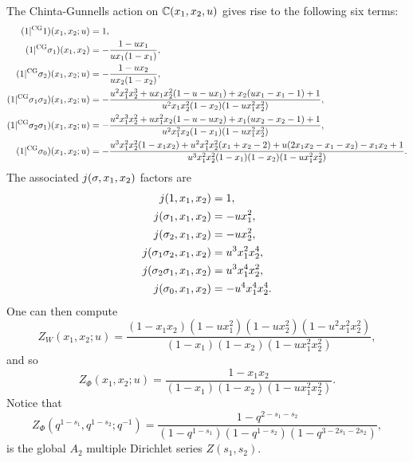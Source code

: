     The Chinta-Gunnells action on $\mathbb{C}(x_{1},x_{2},u)$ gives rise to the following six terms:
    \begin{align*}
        (1|^{\mathrm{CG}}1)(x_{1},x_{2};u) &= 1, \\
        (1|^{\mathrm{CG}}\sigma_{1})(x_{1},x_{2}) &= -\frac{1-ux_{1}}{ux_{1}(1-x_{1})}, \\
        (1|^{\mathrm{CG}}\sigma_{2})(x_{1},x_{2};u) &= -\frac{1-ux_{2}}{ux_{2}(1-x_{2})}, \\
        (1|^{\mathrm{CG}}\sigma_{1}\sigma_{2})(x_{1},x_{2};u) &= -\frac{u^{2}x_{1}^{2}x_{2}^{3}+ux_{1}x_{2}^{2}(1-u-ux_{1})+x_{2}(ux_{1}-x_{1}-1)+1}{u^{2}x_{1}x_{2}^{2}(1-x_{2})(1-ux_{1}^{2}x_{2}^{2})}, \\
        (1|^{\mathrm{CG}}\sigma_{2}\sigma_{1})(x_{1},x_{2};u) &= -\frac{u^{2}x_{1}^{3}x_{2}^{2}+ux_{1}^{2}x_{2}(1-u-ux_{2})+x_{1}(ux_{2}-x_{2}-1)+1}{u^{2}x_{1}^{2}x_{2}(1-x_{1})(1-ux_{1}^{2}x_{2}^{2})}, \\
        (1|^{\mathrm{CG}}\sigma_{0})(x_{1},x_{2};u) &= -\frac{u^{3}x_{1}^{2}x_{2}^{2}(1-x_{1}x_{2})+u^{2}x_{1}^{2}x_{2}^{2}(x_{1}+x_{2}-2)+u(2x_{1}x_{2}-x_{1}-x_{2})-x_{1}x_{2}+1}{u^{3}x_{1}^{2}x_{2}^{2}(1-x_{1})(1-x_{2})(1-ux_{1}^{2}x_{2}^{2})}.
    \end{align*}
    The associated $j(\sigma,x_{1},x_{2})$ factors are
    \begin{align*}
        j(1,x_{1},x_{2}) &= 1, \\
        j(\sigma_{1},x_{1},x_{2}) &= -ux_{1}^{2}, \\
        j(\sigma_{2},x_{1},x_{2}) &= -ux_{2}^{2}, \\
        j(\sigma_{1}\sigma_{2},x_{1},x_{2}) &= u^{3}x_{1}^{2}x_{2}^{4}, \\
        j(\sigma_{2}\sigma_{1},x_{1},x_{2}) &= u^{3}x_{1}^{4}x_{2}^{2}, \\
        j(\sigma_{0},x_{1},x_{2}) &= -u^{4}x_{1}^{4}x_{2}^{4}.
    \end{align*}
    One can then compute
    \[
        Z_{W}(x_{1},x_{2};u) = \frac{(1-x_{1}x_{2})(1-ux_{1}^{2})(1-ux_{2}^{2})(1-u^{2}x_{1}^{2}x_{2}^{2})}{(1-x_{1})(1-x_{2})(1-ux_{1}^{2}x_{2}^{2})},
    \]
    and so
    \[
        Z_{\Phi}(x_{1},x_{2};u) = \frac{1-x_{1}x_{2}}{(1-x_{1})(1-x_{2})(1-ux_{1}^{2}x_{2}^{2})}.
    \]
    Notice that
    \[
        Z_{\Phi}(q^{1-s_{1}},q^{1-s_{2}};q^{-1}) = \frac{1-q^{2-s_{1}-s_{2}}}{(1-q^{1-s_{1}})(1-q^{1-s_{2}})(1-q^{3-2s_{1}-2s_{2}})},
    \]
    is the global $A_{2}$ multiple Dirichlet series $Z(s_{1},s_{2})$.